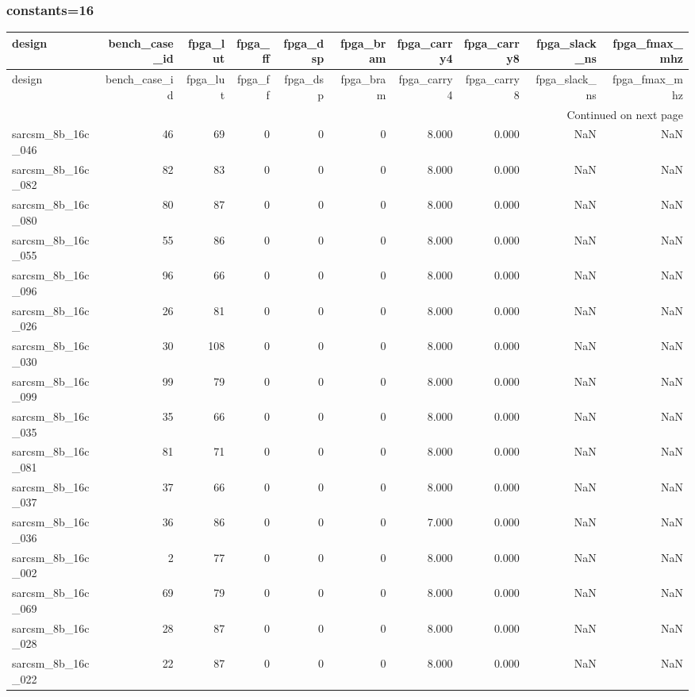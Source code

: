 \documentclass{article}
\begin{document}
\subsubsection*{constants=16}
\begin{longtable}{lrrrrrrrrr}
\toprule
design & bench\_case\_id & fpga\_lut & fpga\_ff & fpga\_dsp & fpga\_bram & fpga\_carry4 & fpga\_carry8 & fpga\_slack\_ns & fpga\_fmax\_mhz \\
\midrule
\endfirsthead
\toprule
design & bench\_case\_id & fpga\_lut & fpga\_ff & fpga\_dsp & fpga\_bram & fpga\_carry4 & fpga\_carry8 & fpga\_slack\_ns & fpga\_fmax\_mhz \\
\midrule
\endhead
\midrule
\multicolumn{10}{r}{Continued on next page} \\
\midrule
\endfoot
\bottomrule
\endlastfoot
sarcsm\_8b\_16c\_046 & 46 & 69 & 0 & 0 & 0 & 8.000 & 0.000 & NaN & NaN \\
sarcsm\_8b\_16c\_082 & 82 & 83 & 0 & 0 & 0 & 8.000 & 0.000 & NaN & NaN \\
sarcsm\_8b\_16c\_080 & 80 & 87 & 0 & 0 & 0 & 8.000 & 0.000 & NaN & NaN \\
sarcsm\_8b\_16c\_055 & 55 & 86 & 0 & 0 & 0 & 8.000 & 0.000 & NaN & NaN \\
sarcsm\_8b\_16c\_096 & 96 & 66 & 0 & 0 & 0 & 8.000 & 0.000 & NaN & NaN \\
sarcsm\_8b\_16c\_026 & 26 & 81 & 0 & 0 & 0 & 8.000 & 0.000 & NaN & NaN \\
sarcsm\_8b\_16c\_030 & 30 & 108 & 0 & 0 & 0 & 8.000 & 0.000 & NaN & NaN \\
sarcsm\_8b\_16c\_099 & 99 & 79 & 0 & 0 & 0 & 8.000 & 0.000 & NaN & NaN \\
sarcsm\_8b\_16c\_035 & 35 & 66 & 0 & 0 & 0 & 8.000 & 0.000 & NaN & NaN \\
sarcsm\_8b\_16c\_081 & 81 & 71 & 0 & 0 & 0 & 8.000 & 0.000 & NaN & NaN \\
sarcsm\_8b\_16c\_037 & 37 & 66 & 0 & 0 & 0 & 8.000 & 0.000 & NaN & NaN \\
sarcsm\_8b\_16c\_036 & 36 & 86 & 0 & 0 & 0 & 7.000 & 0.000 & NaN & NaN \\
sarcsm\_8b\_16c\_002 & 2 & 77 & 0 & 0 & 0 & 8.000 & 0.000 & NaN & NaN \\
sarcsm\_8b\_16c\_069 & 69 & 79 & 0 & 0 & 0 & 8.000 & 0.000 & NaN & NaN \\
sarcsm\_8b\_16c\_028 & 28 & 87 & 0 & 0 & 0 & 8.000 & 0.000 & NaN & NaN \\
sarcsm\_8b\_16c\_022 & 22 & 87 & 0 & 0 & 0 & 8.000 & 0.000 & NaN & NaN \\

\end{longtable}
\end{document}
